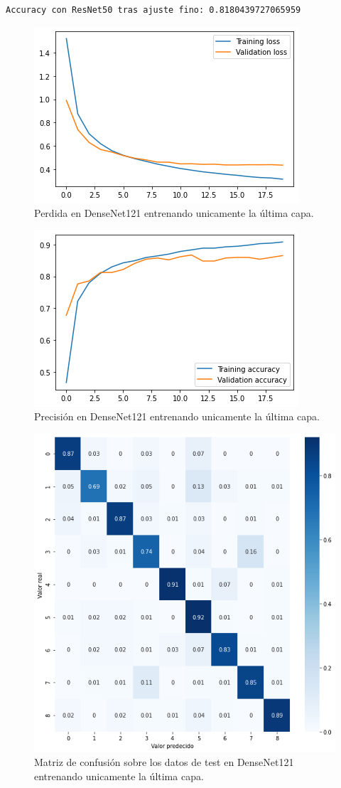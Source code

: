 \begin{lstlisting}
Accuracy con ResNet50 tras ajuste fino: 0.8180439727065959
\end{lstlisting}






\begin{figure}[H]
  \centering
  \includegraphics[width=0.5\linewidth]{Imagenes/entrenamiento_redes/ult/densenet_ult_loss.png}
  \caption{Perdida en DenseNet121 entrenando unicamente la última capa.}
\end{figure}

\begin{figure}[H]
  \centering
  \includegraphics[width=0.5\linewidth]{Imagenes/entrenamiento_redes/ult/densenet_ult_acc.png}
  \caption{Precisión en DenseNet121 entrenando unicamente la última capa.}
\end{figure}

\begin{figure}[H]
  \centering
  \includegraphics[width=0.5\linewidth]{Imagenes/entrenamiento_redes/ult/densenet_ult_matriz.png}
  \caption{Matriz de confusión sobre los datos de test en DenseNet121 entrenando unicamente la última capa.}
\end{figure}

